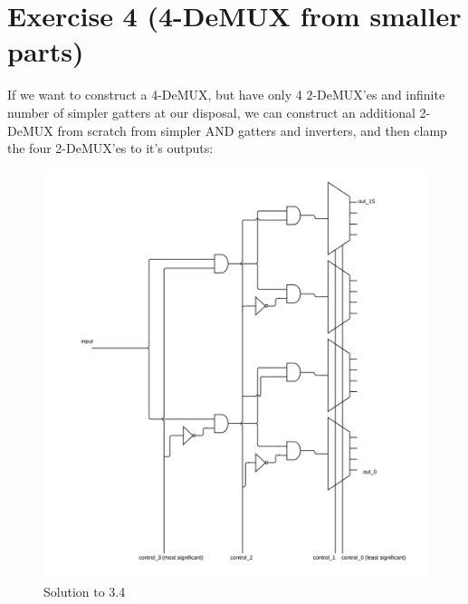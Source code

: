 \documentclass[10pt,a4paper]{scrartcl}
\begin{document}
\section*{Exercise 4 (4-DeMUX from smaller parts)}
If we want to construct a 4-DeMUX, but have only 4 2-DeMUX'es and infinite number of
simpler gatters at our disposal, we can construct an additional 2-DeMUX from scratch
from simpler AND gatters and inverters, and then clamp the four 2-DeMUX'es to it's 
outputs:
\vspace{1em}
\begin{figure}[h]
  \centering\includegraphics[width=\linewidth]{images/exercise_3_4.png}
  \caption{Solution to 3.4}
\end{figure}
\vspace{1em}
\end{document}
